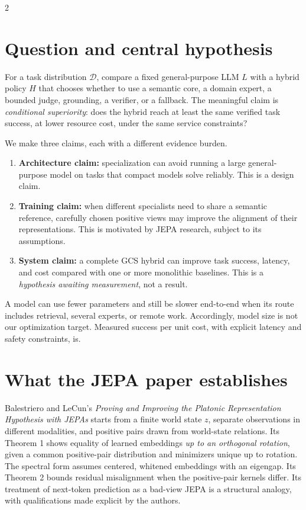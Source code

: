 \documentclass[10pt,letterpaper]{article}
\begin{document}
\vspace{10pt}
\begin{multicols}{2}
\section{Question and central hypothesis}
For a task distribution $\mathcal{D}$, compare a fixed general-purpose LLM $L$ with a hybrid policy $H$ that chooses whether to use a semantic core, a domain expert, a bounded judge, grounding, a verifier, or a fallback. The meaningful claim is \emph{conditional superiority}: does the hybrid reach at least the same verified task success, at lower resource cost, under the same service constraints?

We make three claims, each with a different evidence burden.
\begin{enumerate}
\item \textbf{Architecture claim:} specialization can avoid running a large general-purpose model on tasks that compact models solve reliably. This is a design claim.
\item \textbf{Training claim:} when different specialists need to share a semantic reference, carefully chosen positive views may improve the alignment of their representations. This is motivated by JEPA research, subject to its assumptions.
\item \textbf{System claim:} a complete GCS hybrid can improve task success, latency, and cost compared with one or more monolithic baselines. This is a \emph{hypothesis awaiting measurement}, not a result.
\end{enumerate}

A model can use fewer parameters and still be slower end-to-end when its route includes retrieval, several experts, or remote work. Accordingly, model size is not our optimization target. Measured success per unit cost, with explicit latency and safety constraints, is.

\section{What the JEPA paper establishes}
Balestriero and LeCun's \emph{Proving and Improving the Platonic Representation Hypothesis with JEPAs} \cite{balestriero2026} starts from a finite world state $z$, separate observations in different modalities, and positive pairs drawn from world-state relations. Its Theorem 1 shows equality of learned embeddings \emph{up to an orthogonal rotation}, given a common positive-pair distribution and minimizers unique up to rotation. The spectral form assumes centered, whitened embeddings with an eigengap. Its Theorem 2 bounds residual misalignment when the positive-pair kernels differ. Its treatment of next-token prediction as a bad-view JEPA is a structural analogy, with qualifications made explicit by the authors.


\end{multicols}
\end{document}
